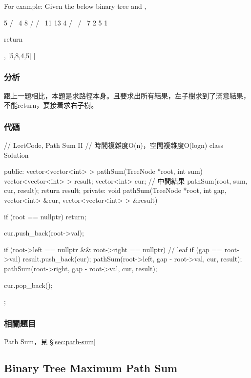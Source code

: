 For example:
Given the below binary tree and ,
\begin{Code}
          5
         / \
        4   8
       /   / \
      11  13  4
     /  \    / \
    7    2  5   1
\end{Code}
return
\begin{Code}
[
   [5,4,11,2],
   [5,8,4,5]
]
\end{Code}


\subsubsection{分析}
跟上一題相比，本題是求路徑本身。且要求出所有結果，左子樹求到了滿意結果，不能return，要接着求右子樹。

\subsubsection{代碼}

\begin{Code}
// LeetCode, Path Sum II
// 時間複雜度O(n)，空間複雜度O(logn)
class Solution {
public:
    vector<vector<int> > pathSum(TreeNode *root, int sum) {
        vector<vector<int> > result;
        vector<int> cur; // 中間結果
        pathSum(root, sum, cur, result);
        return result;
    }
private:
    void pathSum(TreeNode *root, int gap, vector<int> &cur,
            vector<vector<int> > &result) {
        if (root == nullptr) return;

        cur.push_back(root->val);

        if (root->left == nullptr && root->right == nullptr) { // leaf
            if (gap == root->val)
                result.push_back(cur);
        }
        pathSum(root->left, gap - root->val, cur, result);
        pathSum(root->right, gap - root->val, cur, result);

        cur.pop_back();
    }
};
\end{Code}


\subsubsection{相關題目}
\begindot
\item Path Sum，見 \S \ref{sec:path-sum}
\myenddot


\subsection{Binary Tree Maximum Path Sum}
\label{sec:binary-tree-maximum-path-sum}


